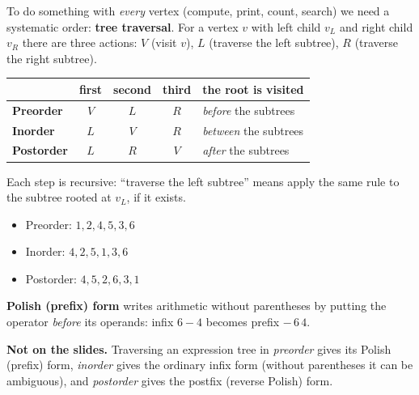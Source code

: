 \documentclass{fkt-notes}
\newcommand{\notslides}[1]{\par\noindent\textbf{Not on the slides.} #1\par}
\theoremstyle{definition}
\begin{document}
To do something with \emph{every} vertex (compute, print, count, search)
we need a systematic order: \textbf{tree traversal}. For a vertex $v$ with
left child $v_L$ and right child $v_R$ there are three actions: $V$ (visit
$v$), $L$ (traverse the left subtree), $R$ (traverse the right subtree).

\begin{rulepar}
  \begin{center}
    \begin{tabular}{l|ccc|l}
                         & first & second & third & the root is visited         \\\hline
      \textbf{Preorder}  & $V$   & $L$    & $R$   & \emph{before} the subtrees  \\
      \textbf{Inorder}   & $L$   & $V$    & $R$   & \emph{between} the subtrees \\
      \textbf{Postorder} & $L$   & $R$    & $V$   & \emph{after} the subtrees
    \end{tabular}
  \end{center}
\end{rulepar}
Each step is recursive: ``traverse the left subtree'' means apply the same
rule to the subtree rooted at $v_L$, if it exists.

\begin{example}\leavevmode\par\noindent
  \begin{minipage}[c]{0.3\textwidth}
    \centering
  \end{minipage}\hfill
  \begin{minipage}[c]{0.66\textwidth}
    \begin{itemize}[nosep]
      \item Preorder: $1,2,4,5,3,6$
      \item Inorder: $4,2,5,1,3,6$
      \item Postorder: $4,5,2,6,3,1$
    \end{itemize}
  \end{minipage}
\end{example}

\textbf{Polish (prefix) form} writes arithmetic without parentheses by
putting the operator \emph{before} its operands: infix $6-4$ becomes
prefix $-\,6\,4$.
\notslides{Traversing an expression tree in \emph{preorder} gives its
  Polish (prefix) form, \emph{inorder} gives the ordinary infix form (without
  parentheses it can be ambiguous), and \emph{postorder} gives the postfix
  (reverse Polish) form.}
\end{document}
